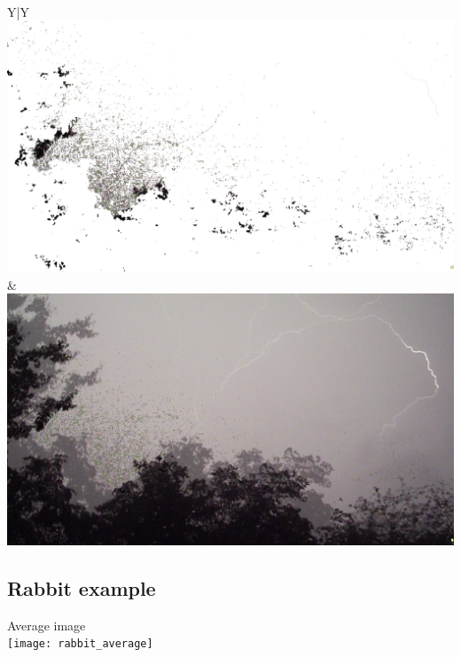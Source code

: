 \documentclass[10pt,a4paper,parskip=full]{scrartcl}
\begin{document}
\begin{tabularx}{\linewidth}{Y|Y}
	 	\\
	 	
	 			\includegraphics[width=\linewidth]{80/lightning_neg}
	 	&
	 	\includegraphics[width=\linewidth]{80/lightning_result}\\ \hline
	\end{tabularx}

	\subsection{Rabbit example}
	\centering Average image\\
	\texttt{[image: rabbit\_average]}
	\newpage
\end{document}
